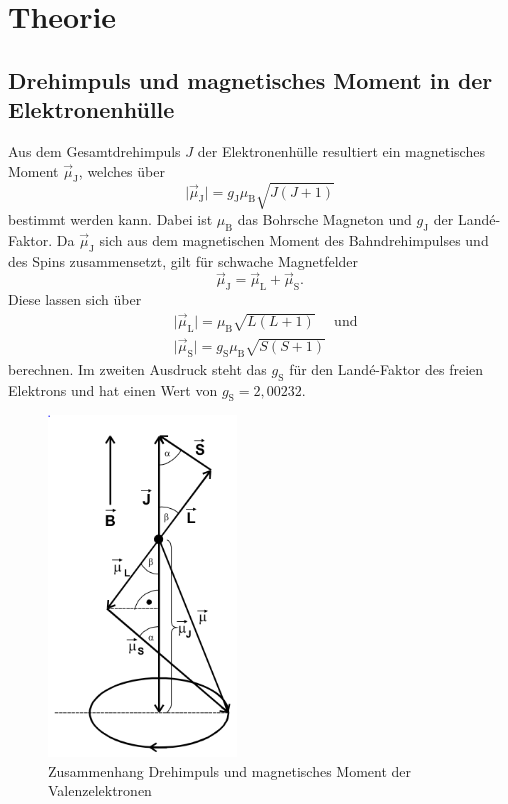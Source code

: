 \section{Theorie}
\label{sec:Theorie}

\subsection{Drehimpuls und magnetisches Moment in der Elektronenhülle}
\label{subs:Drehimpuls und magnetisches Moment in der Elektronenhülle}

Aus dem Gesamtdrehimpuls $J$ der Elektronenhülle resultiert ein magnetisches Moment $\vec \mu_\text{J}$, welches über
\begin{equation}
  \big \vert \vec \mu_\text{J}\big \vert=g_\text{J}\mu_\text{B} \sqrt{J(J+1)}
\end{equation}
bestimmt werden kann. Dabei ist $\mu_\text{B}$ das Bohrsche Magneton und $g_\text{J}$ der Landé-Faktor.
Da $\vec\mu_\text{J}$ sich aus dem magnetischen Moment des Bahndrehimpulses und des Spins zusammensetzt, gilt für schwache Magnetfelder
\begin{equation}
  \vec\mu_\text{J}=\vec\mu_\text{L}+\vec\mu_\text{S}.
\end{equation}
Diese lassen sich über
\begin{align}
  &\big \vert\vec \mu_\text{L}\big \vert=\mu_\text{B} \sqrt{L(L+1)} ~~~~~~\text{und}\\
  &\big \vert\vec \mu_\text{S}\big \vert=g_\text{S}\mu_\text{B} \sqrt{S(S+1)}
\end{align}
berechnen. Im zweiten Ausdruck steht das $g_\text{S}$ für den Landé-Faktor des freien Elektrons und hat einen Wert von $g_\text{S}=2,00232$.
\begin{figure}[H]
	\centering
	\includegraphics[width=5cm]{abb1.jpg}
	\caption{Zusammenhang Drehimpuls und magnetisches Moment der Valenzelektronen \cite{V21}}
	\label{abb:abb1}
\end{figure}
